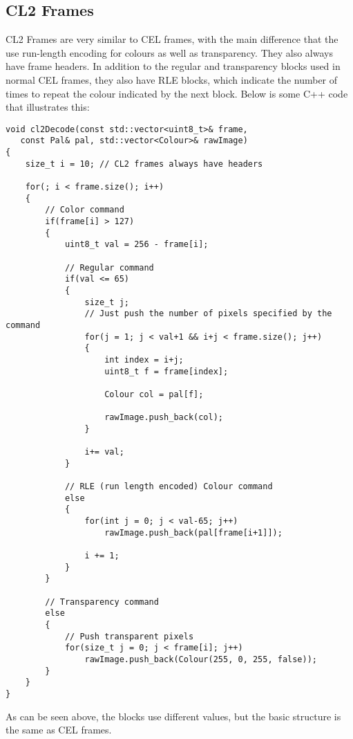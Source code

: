 \newpage

\subsection{CL2 Frames}
	CL2 Frames are very similar to CEL frames, with the main difference that the use run-length encoding for colours as well as transparency. They also always have frame headers.
   In addition to the regular and transparency blocks used in normal CEL frames, they also have RLE blocks, which indicate the number of times to repeat the colour indicated by the next block.
   Below is some C++ code that illustrates this:
   
   \begin{lstlisting}
void cl2Decode(const std::vector<uint8_t>& frame, 
   const Pal& pal, std::vector<Colour>& rawImage)
{
    size_t i = 10; // CL2 frames always have headers

    for(; i < frame.size(); i++)
    {
        // Color command
        if(frame[i] > 127)
        {
            uint8_t val = 256 - frame[i];
           
            // Regular command
            if(val <= 65)
            {
                size_t j;
                // Just push the number of pixels specified by the command
                for(j = 1; j < val+1 && i+j < frame.size(); j++)
                {
                    int index = i+j;
                    uint8_t f = frame[index];

                    Colour col = pal[f];

                    rawImage.push_back(col);
                }
              
                i+= val;
            }

            // RLE (run length encoded) Colour command
            else
            {
                for(int j = 0; j < val-65; j++)
                    rawImage.push_back(pal[frame[i+1]]);
          
                i += 1;
            }
        }
        
        // Transparency command
        else
        {
            // Push transparent pixels
            for(size_t j = 0; j < frame[i]; j++)
                rawImage.push_back(Colour(255, 0, 255, false));
        }
    }
}
   \end{lstlisting}
   
   As can be seen above, the blocks use different values, but the basic structure is the same as CEL frames.
   
